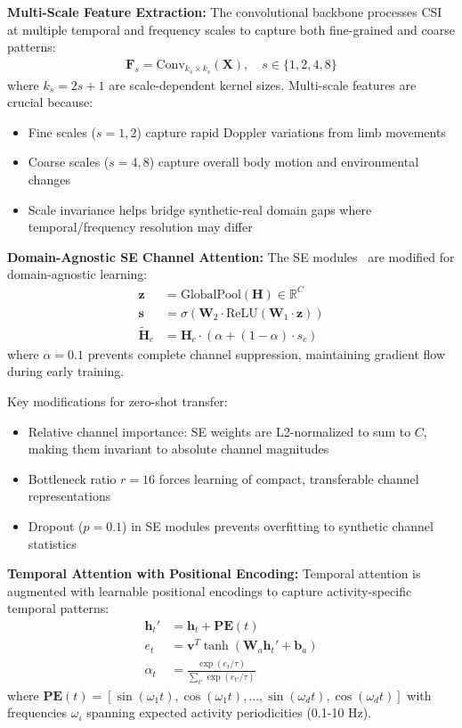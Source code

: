 \documentclass[journal]{IEEEtran}
\begin{document}
\textbf{Multi-Scale Feature Extraction:}
The convolutional backbone processes CSI at multiple temporal and frequency scales to capture both fine-grained and coarse patterns:
\begin{align}
\mathbf{F}_s = \text{Conv}_{k_s \times k_s}(\mathbf{X}), \quad s \in \{1, 2, 4, 8\}
\end{align}
where $k_s = 2s + 1$ are scale-dependent kernel sizes. Multi-scale features are crucial because:
\begin{itemize}
\item Fine scales ($s=1,2$) capture rapid Doppler variations from limb movements
\item Coarse scales ($s=4,8$) capture overall body motion and environmental changes
\item Scale invariance helps bridge synthetic-real domain gaps where temporal/frequency resolution may differ
\end{itemize}

\textbf{Domain-Agnostic SE Channel Attention:}
The SE modules~\cite{se_networks2018} are modified for domain-agnostic learning:
\begin{align}
\mathbf{z} &= \text{GlobalPool}(\mathbf{H}) \in \mathbb{R}^C \\
\mathbf{s} &= \sigma(\mathbf{W}_2 \cdot \text{ReLU}(\mathbf{W}_1 \cdot \mathbf{z})) \\
\tilde{\mathbf{H}}_c &= \mathbf{H}_c \cdot (\alpha + (1-\alpha) \cdot s_c)
\end{align}
where $\alpha = 0.1$ prevents complete channel suppression, maintaining gradient flow during early training.

Key modifications for zero-shot transfer:
\begin{itemize}
\item Relative channel importance: SE weights are L2-normalized to sum to $C$, making them invariant to absolute channel magnitudes
\item Bottleneck ratio $r=16$ forces learning of compact, transferable channel representations
\item Dropout ($p=0.1$) in SE modules prevents overfitting to synthetic channel statistics
\end{itemize}

\textbf{Temporal Attention with Positional Encoding:}
Temporal attention is augmented with learnable positional encodings to capture activity-specific temporal patterns:
\begin{align}
\mathbf{h}_t' &= \mathbf{h}_t + \mathbf{PE}(t) \\
e_t &= \mathbf{v}^T \tanh(\mathbf{W}_a \mathbf{h}_t' + \mathbf{b}_a) \\
\alpha_t &= \frac{\exp(e_t/\tau)}{\sum_{t'} \exp(e_{t'}/\tau)}
\end{align}
where $\mathbf{PE}(t) = [\sin(\omega_1 t), \cos(\omega_1 t), ..., \sin(\omega_d t), \cos(\omega_d t)]$ with frequencies $\omega_i$ spanning expected activity periodicities (0.1-10 Hz).
\end{document}
